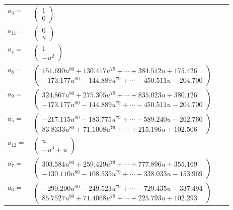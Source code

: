 \documentclass[1p]{elsarticle_modified}
\theoremstyle{definition}
\begin{document}
\begin{tabular}{m{7pt} m{180pt} m{7pt} m{180pt} }
\flushright $a_{3}=$&$\begin{pmatrix}1\\0\end{pmatrix}$ \\
\flushright $a_{11}=$&$\begin{pmatrix}0\\u\end{pmatrix}$ \\
\flushright $a_{4}=$&$\begin{pmatrix}1\\- u^2\end{pmatrix}$ \\
\flushright $a_{8}=$&$\begin{pmatrix}151.690 u^{80}+130.417 u^{79}+\cdots+384.512 u+175.426\\-173.177 u^{80}-144.889 u^{79}+\cdots-450.511 u-204.700\end{pmatrix}$ \\
\flushright $a_{9}=$&$\begin{pmatrix}324.867 u^{80}+275.305 u^{79}+\cdots+835.023 u+380.126\\-173.177 u^{80}-144.889 u^{79}+\cdots-450.511 u-204.700\end{pmatrix}$ \\
\flushright $a_{5}=$&$\begin{pmatrix}-217.115 u^{80}-183.775 u^{79}+\cdots-589.240 u-262.760\\83.8333 u^{80}+71.1008 u^{79}+\cdots+215.196 u+102.506\end{pmatrix}$ \\
\flushright $a_{12}=$&$\begin{pmatrix}u\\- u^3+u\end{pmatrix}$ \\
\flushright $a_{7}=$&$\begin{pmatrix}303.584 u^{80}+259.429 u^{79}+\cdots+777.896 u+355.169\\-130.110 u^{80}-108.535 u^{79}+\cdots-338.033 u-153.969\end{pmatrix}$ \\
\flushright $a_{6}=$&$\begin{pmatrix}-290.200 u^{80}-249.523 u^{79}+\cdots-729.435 u-337.494\\85.7527 u^{80}+71.4068 u^{79}+\cdots+225.793 u+102.293\end{pmatrix}$ \\

\end{tabular}
\end{document}

